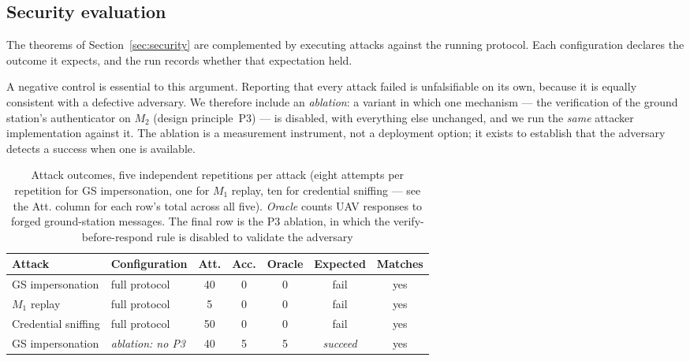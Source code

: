 \documentclass[11pt,a4paper]{article}
\begin{document}
\subsection{Security evaluation}
\label{subsec:security_eval}

The theorems of Section~\ref{sec:security} are complemented by executing attacks
against the running protocol. Each configuration declares the outcome it expects,
and the run records whether that expectation held.

A negative control is essential to this argument. Reporting that every attack
failed is unfalsifiable on its own, because it is equally consistent with a
defective adversary. We therefore include an \emph{ablation}: a variant in which
one mechanism --- the verification of the ground station's authenticator on $M_2$
(design principle~P3) --- is disabled, with everything else unchanged, and we run
the \emph{same} attacker implementation against it. The ablation is a measurement
instrument, not a deployment option; it exists to establish that the adversary
detects a success when one is available.

\begin{table}[H]
\centering
\caption{Attack outcomes, five independent repetitions per attack (eight attempts
per repetition for GS impersonation, one for $M_1$ replay, ten for credential
sniffing --- see the Att. column for each row's total across all five).
\emph{Oracle} counts UAV responses to forged ground-station messages. The final
row is the P3 ablation, in which the verify-before-respond rule is disabled to
validate the adversary}
\label{tab:attacks}
\small
\begin{tabular}{@{}llccccc@{}}
\toprule
\textbf{Attack} & \textbf{Configuration} & \textbf{Att.} & \textbf{Acc.} &
\textbf{Oracle} & \textbf{Expected} & \textbf{Matches} \\
\midrule
GS impersonation & full protocol & 40 & 0 & 0 & fail & yes \\
$M_1$ replay & full protocol & 5 & 0 & 0 & fail & yes \\
Credential sniffing & full protocol & 50 & 0 & 0 & fail & yes \\
\midrule
GS impersonation & \emph{ablation: no P3} & 40 & 5 & 5 & \emph{succeed} & yes \\
\bottomrule
\end{tabular}
\end{table}
\end{document}
